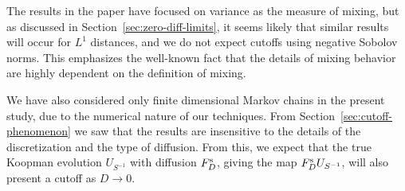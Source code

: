 \documentclass{aims}
\theoremstyle{definition}
\begin{document}
The results in the paper have focused on variance as the measure of
mixing, but as discussed in Section~\ref{sec:zero-diff-limits}, it
seems likely that similar results will occur for $L^1$ distances, and
we do not expect cutoffs using negative Sobolov norms. This emphasizes
the well-known fact that the details of mixing behavior are highly
dependent on the definition of mixing.

We have also considered only finite dimensional Markov chains in the
present study, due to the numerical nature of our techniques. From
Section~\ref{sec:cutoff-phenomenon} we saw that the results are
insensitive to the details of the discretization and the type of
diffusion. From this, we expect that the true Koopman evolution
$U_{S^{-1}}$ with diffusion $F^{\rm s}_D$, giving the map $F^{\rm s}_D
U_{S^{-1}}$, will also present a cutoff as $D \to 0$.


 

\end{document}
